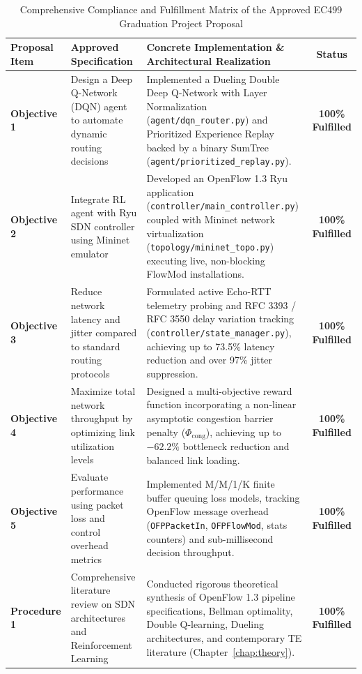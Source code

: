 \documentclass[12pt,a4paper,oneside]{report}
\begin{document}
\begin{table}[htbp]
\centering
\caption{Comprehensive Compliance and Fulfillment Matrix of the Approved EC499 Graduation Project Proposal}
\label{tab:proposal_compliance_ch1}
\scriptsize
\begin{tabularx}{\textwidth}{l p{4.0cm} X c}
\toprule
\textbf{Proposal Item} & \textbf{Approved Specification} & \textbf{Concrete Implementation \& Architectural Realization} & \textbf{Status} \\
\midrule
\textbf{Objective 1} & Design a Deep Q-Network (DQN) agent to automate dynamic routing decisions & Implemented a Dueling Double Deep Q-Network with Layer Normalization (\texttt{agent/dqn\_router.py}) and Prioritized Experience Replay backed by a binary SumTree (\texttt{agent/prioritized\_replay.py}). & \textbf{100\% Fulfilled} \\
\addlinespace
\textbf{Objective 2} & Integrate RL agent with Ryu SDN controller using Mininet emulator & Developed an OpenFlow 1.3 Ryu application (\texttt{controller/main\_controller.py}) coupled with Mininet network virtualization (\texttt{topology/mininet\_topo.py}) executing live, non-blocking FlowMod installations. & \textbf{100\% Fulfilled} \\
\addlinespace
\textbf{Objective 3} & Reduce network latency and jitter compared to standard routing protocols & Formulated active Echo-RTT telemetry probing and RFC 3393 / RFC 3550 delay variation tracking (\texttt{controller/state\_manager.py}), achieving up to 73.5\% latency reduction and over 97\% jitter suppression. & \textbf{100\% Fulfilled} \\
\addlinespace
\textbf{Objective 4} & Maximize total network throughput by optimizing link utilization levels & Designed a multi-objective reward function incorporating a non-linear asymptotic congestion barrier penalty ($\Phi_{\text{cong}}$), achieving up to $-62.2\%$ bottleneck reduction and balanced link loading. & \textbf{100\% Fulfilled} \\
\addlinespace
\textbf{Objective 5} & Evaluate performance using packet loss and control overhead metrics & Implemented M/M/1/K finite buffer queuing loss models, tracking OpenFlow message overhead (\texttt{OFPPacketIn}, \texttt{OFPFlowMod}, stats counters) and sub-millisecond decision throughput. & \textbf{100\% Fulfilled} \\
\midrule
\textbf{Procedure 1} & Comprehensive literature review on SDN architectures and Reinforcement Learning & Conducted rigorous theoretical synthesis of OpenFlow 1.3 pipeline specifications, Bellman optimality, Double Q-learning, Dueling architectures, and contemporary TE literature (Chapter~\ref{chap:theory}). & \textbf{100\% Fulfilled} \\

\end{tabularx}
\end{table}
\end{document}
